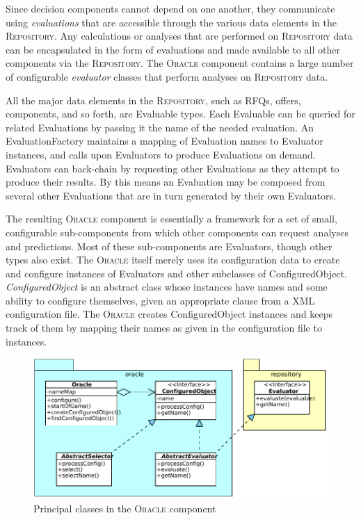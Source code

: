 \documentclass{article}
\begin{document}
Since decision components cannot depend on one another, they communicate using \emph{evaluations} that are accessible through the various data elements in the \textsc{Repository}.
Any calculations or analyses that are performed on \textsc{Repository} data can be encapsulated in the form of evaluations and made available to all other components via the \textsc{Repository}.
The \textsc{Oracle} component contains a large number of configurable \emph{evaluator} classes that perform analyses on \textsc{Repository} data.

All the major data elements in the \textsc{Repository}, such as RFQs, offers, components, and so forth, are Evaluable types.
Each Evaluable can be queried for related Evaluations by passing it the name of the needed evaluation.
An EvaluationFactory maintains a mapping of Evaluation names to Evaluator instances, and calls upon Evaluators to produce Evaluations on demand.
Evaluators can back-chain by requesting other Evaluations as they attempt to produce their results.
By this means an Evaluation may be composed from several other Evaluations that are in turn generated by their own Evaluators.

The resulting \textsc{Oracle} component is essentially a framework for a set of small, configurable sub-components from which other components can request analyses and predictions.
Most of these sub-components are Evaluators, though other types also exist.
The \textsc{Oracle} itself merely uses its configuration data to create and configure instances of Evaluators and other subclasses of ConfiguredObject.
\emph{ConfiguredObject} is an abstract class whose instances have names and some ability to configure themselves, given an appropriate clause from a XML configuration file.
The \textsc{Oracle} creates ConfiguredObject instances and keeps track of them by mapping their names as given in the configuration file to instances.

\begin{figure}[ht]
\centering
\includegraphics[width=\textwidth]{figures/oracle-classes}
\caption{Principal classes in the \textsc{Oracle} component}
\end{figure}
\end{document}
